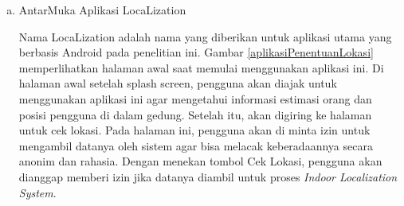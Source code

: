 \begin{enumerate}[a.]
	\item AntarMuka Aplikasi LocaLization

	      \par Nama LocaLization adalah nama yang diberikan untuk aplikasi utama yang berbasis Android pada penelitian ini. Gambar \ref{aplikasiPenentuanLokasi} memperlihatkan halaman awal saat memulai menggunakan aplikasi ini. Di halaman awal setelah splash screen, pengguna akan diajak untuk menggunakan aplikasi ini agar mengetahui informasi estimasi orang dan posisi pengguna di dalam gedung. Setelah itu, akan digiring ke halaman untuk cek lokasi. Pada halaman ini, pengguna akan di minta izin untuk mengambil datanya oleh sistem agar bisa melacak keberadaannya secara anonim dan rahasia. Dengan menekan tombol Cek Lokasi, pengguna akan dianggap memberi izin jika datanya diambil untuk proses \textit{Indoor Localization System}.



\end{enumerate}
